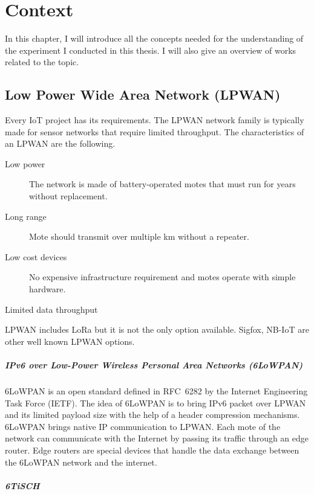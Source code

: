 \chapter{Context\label{section:context}}

In this chapter, I will introduce all the concepts needed for the understanding
of the experiment I conducted in this thesis.
I will also give an overview of works related to the topic.

\section{Low Power Wide Area Network (LPWAN)\label{section:lpwan}}

Every IoT project has its requirements. 
The LPWAN network family is typically made for sensor networks that require
limited throughput.
The characteristics of an LPWAN are the following.

\begin{description}
  \item[Low power] The network is made of battery-operated
    motes that must run for years without replacement.
  \item[Long range] Mote should transmit over multiple km without a repeater.
  \item[Low cost devices] No expensive infrastructure requirement and motes
    operate with simple hardware.
  \item[Limited data throughput]
\end{description}

LPWAN includes LoRa but it is not the only option available. 
Sigfox, NB-IoT are other well known LPWAN options.

\paragraph{IPv6 over Low-Power Wireless Personal Area Networks (6LoWPAN)}

6LoWPAN is an open standard defined in RFC~6282 by the Internet Engineering
Task Force (IETF).
The idea of 6LoWPAN is to bring IPv6 packet over LPWAN and its limited payload
size with the help of a header compression mechanisms.
6LoWPAN brings native IP communication to LPWAN.
Each mote of the network can communicate with the Internet by passing its
traffic through an edge router.
Edge routers are special devices that handle the data exchange between the 
6LoWPAN network and the internet.

\paragraph{6TiSCH}

